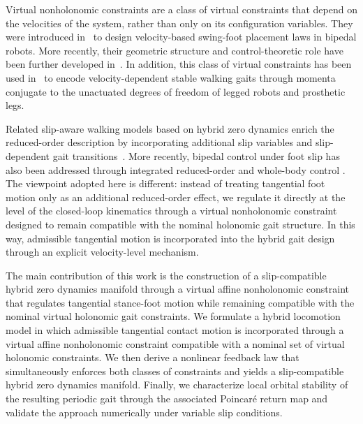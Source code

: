 \documentclass[letterpaper, 10 pt, conference]{ieeeconf}
\begin{document}
Virtual nonholonomic constraints are a class of virtual constraints that depend on the velocities of the system, rather than only on its configuration variables. They were introduced in~\cite{griffin2015nonholonomic,griffin2017nonholonomic} to design velocity-based swing-foot placement laws in bipedal robots. More recently, their geometric structure and control-theoretic role have been further developed in~\cite{simoes2023virtual,stratoglou2024geometry,simoes2025geometric}. In addition, this class of virtual constraints has been used in~\cite{horn2018hybrid,hamed2019nonholonomic,horn2020nonholonomic,horn2021nonholonomic} to encode velocity-dependent stable walking gaits through momenta conjugate to the unactuated degrees of freedom of legged robots and prosthetic legs.

Related slip-aware walking models based on hybrid zero dynamics enrich the reduced-order description by incorporating additional slip variables and slip-dependent gait transitions~\cite{chen2017hybrid,TrkovChenYi2019}. More recently, bipedal control under foot slip has also been addressed through integrated reduced-order and whole-body control \cite{mihalec2022integrated}. The viewpoint adopted here is different: instead of treating tangential foot motion only as an additional reduced-order effect, we regulate it directly at the level of the closed-loop kinematics through a virtual nonholonomic constraint designed to remain compatible with the nominal holonomic gait structure. In this way, admissible tangential motion is incorporated into the hybrid gait design through an explicit velocity-level mechanism.



The main contribution of this work is the construction of a slip-compatible hybrid zero dynamics manifold through a virtual affine nonholonomic constraint that regulates tangential stance-foot motion while remaining compatible with the nominal virtual holonomic gait constraints. We formulate a hybrid locomotion model in which admissible tangential contact motion is incorporated through a virtual affine nonholonomic constraint compatible with a nominal set of virtual holonomic constraints. We then derive a nonlinear feedback law that simultaneously enforces both classes of constraints and yields a slip-compatible hybrid zero dynamics manifold. Finally, we characterize local orbital stability of the resulting periodic gait through the associated Poincaré return map and validate the approach numerically under variable slip conditions.
\end{document}
